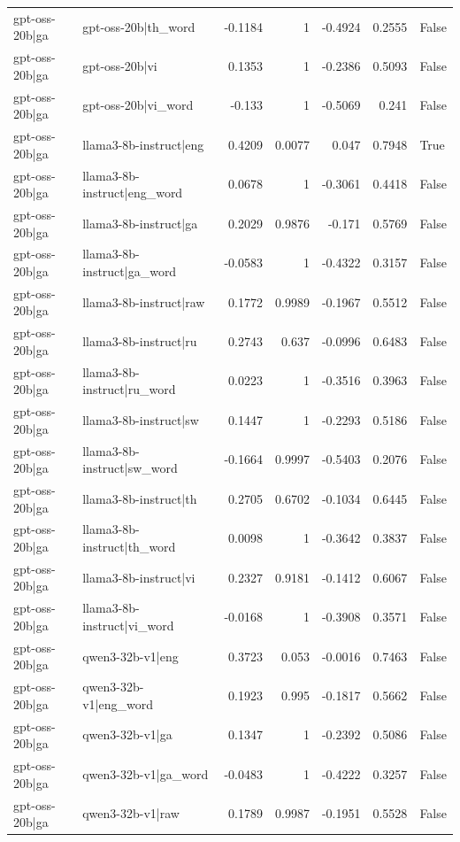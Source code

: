 \begin{table}
\begin{tabular}{l l r r r r l}
gpt-oss-20b|ga & gpt-oss-20b|th_word & -0.1184 & 1 & -0.4924 & 0.2555 & False \\
gpt-oss-20b|ga & gpt-oss-20b|vi & 0.1353 & 1 & -0.2386 & 0.5093 & False \\
gpt-oss-20b|ga & gpt-oss-20b|vi_word & -0.133 & 1 & -0.5069 & 0.241 & False \\
gpt-oss-20b|ga & llama3-8b-instruct|eng & 0.4209 & 0.0077 & 0.047 & 0.7948 & True \\
gpt-oss-20b|ga & llama3-8b-instruct|eng_word & 0.0678 & 1 & -0.3061 & 0.4418 & False \\
gpt-oss-20b|ga & llama3-8b-instruct|ga & 0.2029 & 0.9876 & -0.171 & 0.5769 & False \\
gpt-oss-20b|ga & llama3-8b-instruct|ga_word & -0.0583 & 1 & -0.4322 & 0.3157 & False \\
gpt-oss-20b|ga & llama3-8b-instruct|raw & 0.1772 & 0.9989 & -0.1967 & 0.5512 & False \\
gpt-oss-20b|ga & llama3-8b-instruct|ru & 0.2743 & 0.637 & -0.0996 & 0.6483 & False \\
gpt-oss-20b|ga & llama3-8b-instruct|ru_word & 0.0223 & 1 & -0.3516 & 0.3963 & False \\
gpt-oss-20b|ga & llama3-8b-instruct|sw & 0.1447 & 1 & -0.2293 & 0.5186 & False \\
gpt-oss-20b|ga & llama3-8b-instruct|sw_word & -0.1664 & 0.9997 & -0.5403 & 0.2076 & False \\
gpt-oss-20b|ga & llama3-8b-instruct|th & 0.2705 & 0.6702 & -0.1034 & 0.6445 & False \\
gpt-oss-20b|ga & llama3-8b-instruct|th_word & 0.0098 & 1 & -0.3642 & 0.3837 & False \\
gpt-oss-20b|ga & llama3-8b-instruct|vi & 0.2327 & 0.9181 & -0.1412 & 0.6067 & False \\
gpt-oss-20b|ga & llama3-8b-instruct|vi_word & -0.0168 & 1 & -0.3908 & 0.3571 & False \\
gpt-oss-20b|ga & qwen3-32b-v1|eng & 0.3723 & 0.053 & -0.0016 & 0.7463 & False \\
gpt-oss-20b|ga & qwen3-32b-v1|eng_word & 0.1923 & 0.995 & -0.1817 & 0.5662 & False \\
gpt-oss-20b|ga & qwen3-32b-v1|ga & 0.1347 & 1 & -0.2392 & 0.5086 & False \\
gpt-oss-20b|ga & qwen3-32b-v1|ga_word & -0.0483 & 1 & -0.4222 & 0.3257 & False \\
gpt-oss-20b|ga & qwen3-32b-v1|raw & 0.1789 & 0.9987 & -0.1951 & 0.5528 & False \\

\end{tabular}
\end{table}
